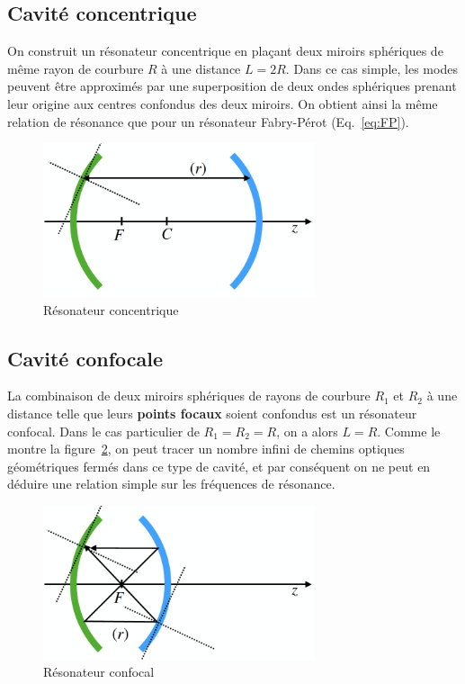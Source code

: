 \documentclass[a4paper]{book}
\begin{document}
\subsection{Cavité concentrique}
On construit un résonateur concentrique en plaçant deux miroirs sphériques de même rayon de courbure $R$ à une distance $L=2R$. Dans ce cas simple, les modes peuvent être approximés par une superposition de deux ondes sphériques prenant leur origine aux centres confondus des deux miroirs. On obtient ainsi la même relation de résonance que pour un résonateur Fabry-Pérot (Eq.~\ref{eq:FP}).

\begin{figure}[!htbp]
\begin{center}
\includegraphics[width=8cm]{pictures/Concentric.png}
\end{center}
\caption{Résonateur concentrique}
\label{fig:resonateur_concentrique}
\end{figure}

\subsection{Cavité confocale}
La combinaison de deux miroirs sphériques de rayons de courbure $R_1$ et $R_2$ à une distance telle que leurs \textbf{points focaux} soient confondus est un résonateur confocal. Dans le cas particulier de $R_1=R_2=R$, on a alors $L=R$. Comme le montre la figure~\ref{fig:resonateur_confocal}, on peut tracer un nombre infini de chemins optiques géométriques fermés dans ce type de cavité, et par conséquent on ne peut en déduire une relation simple sur les fréquences de résonance. 

\begin{figure}[!htbp]
\begin{center}
\includegraphics[width=8cm]{pictures/Confocal.png}
\end{center}
\caption{Résonateur confocal}
\label{fig:resonateur_confocal}
\end{figure}
\end{document}

